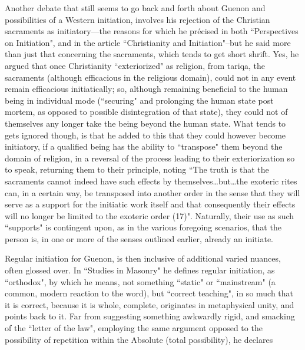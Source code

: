 Another debate that still seems to go back and forth about Guenon and possibilities of a Western initiation, involves his rejection of the Christian sacraments as initiatory—the reasons for which he précised in both ``Perspectives on Initiation", and in the article ``Christianity and Initiation"–but he said more than just that concerning the sacraments, which tends to get short shrift. Yes, he argued that once Christianity ``exteriorized" as religion, from tariqa, the sacraments (although efficacious in the religious domain), could not in any event remain efficacious initiatically; so, although remaining beneficial to the human being in individual mode (``securing" and prolonging the human state post mortem, as opposed to possible disintegration of that state), they could not of themselves any longer take the being beyond the human state. What tends to gets ignored though, is that he added to this that they could however become initiatory, if a qualified being has the ability to ``transpose" them beyond the domain of religion, in a reversal of the process leading to their exteriorization so to speak, returning them to their principle, noting ``The truth is that the sacraments cannot indeed have such effects by themselves…but…the exoteric rites can, in a certain way, be transposed into another order in the sense that they will serve as a support for the initiatic work itself and that consequently their effects will no longer be limited to the exoteric order (17)". Naturally, their use as such ``supports" is contingent upon, as in the various foregoing scenarios, that the person is, in one or more of the senses outlined earlier, already an initiate.

Regular initiation for Guenon, is then inclusive of additional varied nuances, often glossed over. In ``Studies in Masonry" he defines regular initiation, as ``orthodox", by which he means, not something ``static" or ``mainstream" (a common, modern reaction to the word), but ``correct teaching", in so much that it is correct, because it is whole, complete, originates in metaphysical unity, and points back to it. Far from suggesting something awkwardly rigid, and smacking of the ``letter of the law", employing the same argument opposed to the possibility of repetition within the Absolute (total possibility), he declares


